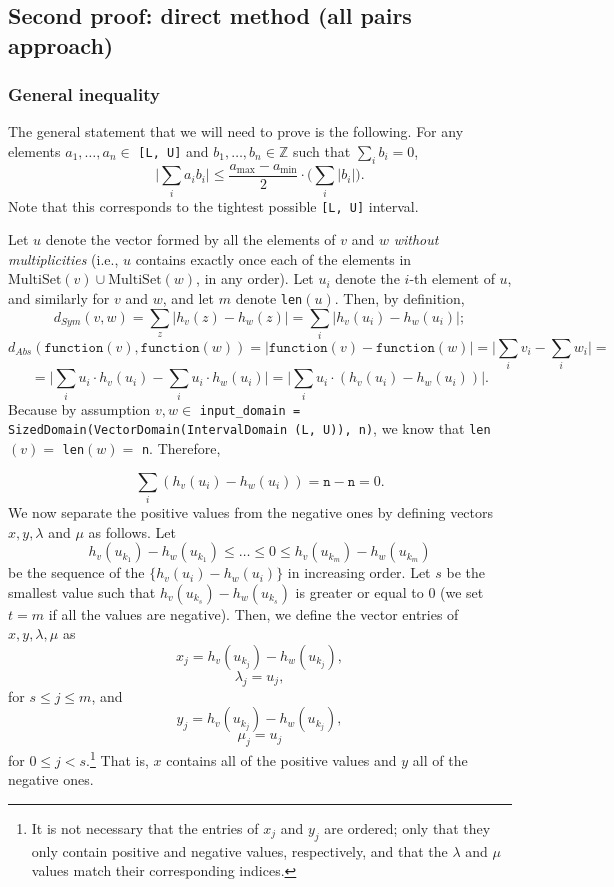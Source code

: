 \documentclass[11pt,a4paper]{article}
\theoremstyle{definition}
\newcommand{\MultiSet}{\mathrm{MultiSet}}
\newcommand{\function}{\texttt{function}}
\begin{document}
\subsection{Second proof: direct method (all pairs approach)}
\subsubsection{General inequality}
The general statement that we will need to prove is the following. For any elements $a_1, \ldots, a_n \in$ \texttt{[L, U]} and $b_1, \ldots, b_n \in \mathbb{Z}$ such that $\sum_i b_i = 0$, 
\[
    \Big|\sum_i a_ib_i\Big| \leq \dfrac{a_{\max}-a_{\min}}{2} \cdot \Big(\sum_i |b_i| \Big).
\]
Note that this corresponds to the tightest possible \texttt{[L, U]} interval.

Let $u$ denote the vector formed by all the elements of $v$ and $w$ \textit{without multiplicities} (i.e., $u$ contains exactly once each of the elements in $\MultiSet(v) \cup \MultiSet(w)$, in any order). Let $u_i$ denote the $i$-th element of $u$, and similarly for $v$ and $w$, and let $m$ denote \texttt{len}$(u)$.  
Then, by definition,
\[
    d_{Sym}(v, w) = \sum_z \Big|h_v(z) - h_w(z)\Big| = \sum_i \Big|h_v(u_i) - h_w(u_i)\Big|;
\]
\[
    d_{Abs}(\function(v), \function(w)) = \Big|\function(v) - \function(w)\Big| = \Big|\sum_i v_i - \sum_i w_i\Big| = 
\]
\[
   = \Big|\sum_i u_i \cdot h_v(u_i) - \sum_i u_i \cdot h_w(u_i)\Big| = \Big|\sum_i u_i \cdot (h_v(u_i) - h_w(u_i))\Big|.
\]
Because by assumption $v, w \in $ \texttt{input\_domain = SizedDomain(VectorDomain(IntervalDomain (L, U)), n)}, we know that \texttt{len}$(v) =$ \texttt{len}$(w) =$ \texttt{n}. Therefore,

\begin{equation}\label{eq:sum}
    \sum_i (h_v(u_i) - h_w(u_i)) = \texttt{n}-\texttt{n} = 0.
\end{equation}
We now separate the positive values from the negative ones by defining vectors $x, y, \lambda$ and $\mu$ as follows. Let
\[
    h_v(u_{k_1})-h_w(u_{k_1}) \leq \ldots \leq 0 \leq h_v(u_{k_m})-h_w(u_{k_m}) 
\]
be the sequence of the $\{h_v(u_i)-h_w(u_{i})\}$ in increasing order. Let $s$ be the smallest value such that $h_v(u_{k_s})-h_w(u_{k_s})$ is greater or equal to 0 (we set $t=m$ if all the values are negative). Then, we define the vector entries of $x, y, \lambda, \mu$ as
\[
    x_j = h_v(u_{k_{j}})-h_w(u_{k_{j}}),
\]
\[
    \lambda_j = u_{j},
\]
for $s \leq j \leq m$, and
\[
    y_j = h_v(u_{k_{j}})-h_w(u_{k_{j}}),
\]
\[
    \mu_j = u_j
\]
for $0 \leq j < s$.\footnote{It is not necessary that the entries of $x_j$ and $y_j$ are ordered; only that they only contain positive and negative values, respectively, and that the $\lambda$ and $\mu$ values match their corresponding indices.} That is, $x$ contains all of the positive values and $y$ all of the negative ones.
\end{document}
